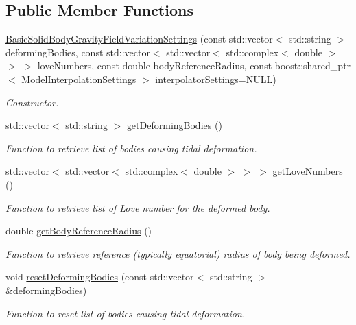 \subsection*{Public Member Functions}
\begin{DoxyCompactItemize}
\item 
\hyperlink{classtudat_1_1simulation__setup_1_1BasicSolidBodyGravityFieldVariationSettings_a26cb151a6e02b2c97fcc6f912795ecc9}{Basic\+Solid\+Body\+Gravity\+Field\+Variation\+Settings} (const std\+::vector$<$ std\+::string $>$ deforming\+Bodies, const std\+::vector$<$ std\+::vector$<$ std\+::complex$<$ double $>$ $>$ $>$ love\+Numbers, const double body\+Reference\+Radius, const boost\+::shared\+\_\+ptr$<$ \hyperlink{classtudat_1_1simulation__setup_1_1ModelInterpolationSettings}{Model\+Interpolation\+Settings} $>$ interpolator\+Settings=N\+U\+LL)
\begin{DoxyCompactList}\small\item\em Constructor. \end{DoxyCompactList}\item 
std\+::vector$<$ std\+::string $>$ \hyperlink{classtudat_1_1simulation__setup_1_1BasicSolidBodyGravityFieldVariationSettings_a31ba2f956752d37ffae251e8ca66c5d3}{get\+Deforming\+Bodies} ()
\begin{DoxyCompactList}\small\item\em Function to retrieve list of bodies causing tidal deformation. \end{DoxyCompactList}\item 
std\+::vector$<$ std\+::vector$<$ std\+::complex$<$ double $>$ $>$ $>$ \hyperlink{classtudat_1_1simulation__setup_1_1BasicSolidBodyGravityFieldVariationSettings_a2ea95f5725700d6160bde8bf265a477c}{get\+Love\+Numbers} ()
\begin{DoxyCompactList}\small\item\em Function to retrieve list of Love number for the deformed body. \end{DoxyCompactList}\item 
double \hyperlink{classtudat_1_1simulation__setup_1_1BasicSolidBodyGravityFieldVariationSettings_a3782fe04779b35885aac8a6a671a5ffe}{get\+Body\+Reference\+Radius} ()
\begin{DoxyCompactList}\small\item\em Function to retrieve reference (typically equatorial) radius of body being deformed. \end{DoxyCompactList}\item 
void \hyperlink{classtudat_1_1simulation__setup_1_1BasicSolidBodyGravityFieldVariationSettings_a5821016b4eb75b3e119b3d60f4d7cfcc}{reset\+Deforming\+Bodies} (const std\+::vector$<$ std\+::string $>$ \&deforming\+Bodies)
\begin{DoxyCompactList}\small\item\em Function to reset list of bodies causing tidal deformation. \end{DoxyCompactList}\end{DoxyCompactItemize}
